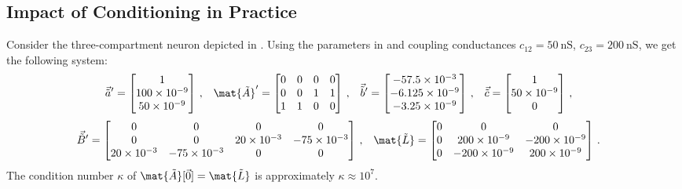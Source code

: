 \subsection{Impact of Conditioning in Practice}
Consider the three-compartment neuron depicted in .
Using the parameters in  and coupling conductances $c_\mathrm{12} = \SI{50}{\nano\siemens}$, $c_\mathrm{23} = \SI{200}{\nano\siemens}$, we get the following system:
\begin{align*}
	\vec{\tilde a}' &= \begin{bmatrix}
		1 \\
		100 \times 10^{-9} \\
		50 \times 10^{-9}
	\end{bmatrix} \,,
	&
	\mat{\tilde A}' &= \begin{bmatrix}
		0 & 0 & 0 & 0 \\
		0 & 0 & 1 & 1 \\
		1 & 1 & 0 & 0
	\end{bmatrix} \,,
	&
	\vec{\tilde b}' &= \begin{bmatrix}
		-57.5 \times 10^{-3} \\
		-6.125 \times 10^{-9} \\
		-3.25 \times 10^{-9}
	\end{bmatrix} \,,
	&
	\vec{\tilde c} &=
	\begin{bmatrix}
		1 \\
		50 \times 10^{-9} \\
		0
	\end{bmatrix} \,,
\end{align*}\vspace*{-0.125em}
\begin{align*}
	\vec{\tilde B}' &=
	\begin{bmatrix}
		0 & 0 & 0 & 0 \\
		0 & 0 & 20 \times 10^{-3} & -75 \times 10^{-3} \\
		20 \times 10^{-3} & -75 \times 10^{-3} & 0 & 0 \\
	\end{bmatrix} \,,
	&
	\mat{\tilde L} &=
	\begin{bmatrix}
		0 & 0 & 0 \\
		0 & 200 \times 10^{-9} & -200 \times 10^{-9} \\
		0 & -200 \times 10^{-9} & 200 \times 10^{-9} \\
	\end{bmatrix} \,.
\end{align*}
The condition number $\kappa$ of $\mat{\tilde A}[\vec{0}] = \mat{\tilde L} $ is approximately $\kappa \approx 10^7$.
